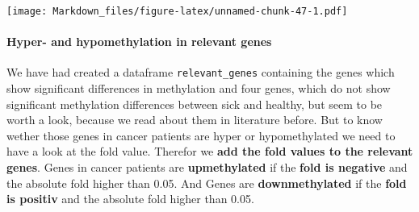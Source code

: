 \documentclass[]{article}
\newenvironment{Shaded}{\begin{snugshade}}{\end{snugshade}}
\newcommand{\KeywordTok}[1]{\textcolor[rgb]{0.13,0.29,0.53}{\textbf{#1}}}
\newcommand{\StringTok}[1]{\textcolor[rgb]{0.31,0.60,0.02}{#1}}
\newcommand{\OperatorTok}[1]{\textcolor[rgb]{0.81,0.36,0.00}{\textbf{#1}}}
\newcommand{\NormalTok}[1]{#1}
\let\oldparagraph\paragraph
\renewcommand{\paragraph}[1]{\oldparagraph{#1}\mbox{}}
\begin{document}
\texttt{[image: Markdown\_files/figure-latex/unnamed-chunk-47-1.pdf]}

\paragraph{Hyper- and hypomethylation in relevant
genes}\label{hyper--and-hypomethylation-in-relevant-genes}

We have had created a dataframe \texttt{relevant\_genes} containing the
genes which show significant differences in methylation and four genes,
which do not show significant methylation differences between sick and
healthy, but seem to be worth a look, because we read about them in
literature before. But to know wether those genes in cancer patients are
hyper or hypomethylated we need to have a look at the fold value.
Therefor we \textbf{add the fold values to the relevant genes}. Genes in
cancer patients are \textbf{upmethylated} if the \textbf{fold is
negative} and the absolute fold higher than 0.05. And Genes are
\textbf{downmethylated} if the \textbf{fold is positiv} and the absolute
fold higher than 0.05.

\begin{Shaded}
\end{Shaded}
\end{document}
